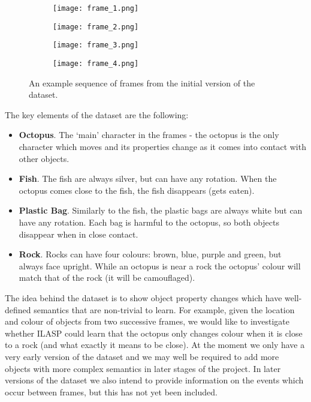 \documentclass[../interim.tex]{subfiles}
\begin{document}
\begin{figure}[ht!]
  \begin{subfigure}{0.24\textwidth}
    \centering
    \texttt{[image: frame\_1.png]}
  \end{subfigure}
  \hfill
  \begin{subfigure}{0.24\textwidth}
    \centering
    \texttt{[image: frame\_2.png]}
  \end{subfigure}
  \hfill
  \begin{subfigure}{0.24\textwidth}
    \centering
    \texttt{[image: frame\_3.png]}
  \end{subfigure}
  \hfill
  \begin{subfigure}{0.24\textwidth}
    \centering
    \texttt{[image: frame\_4.png]}
  \end{subfigure}
  \caption{An example sequence of frames from the initial version of the dataset.}
  \label{fig:dataset-frames}
\end{figure}

The key elements of the dataset are the following:
\begin{itemize}
  \item \textbf{Octopus}. The `main' character in the frames - the octopus is the only character which moves and its properties change as it comes into contact with other objects.

  \item \textbf{Fish}. The fish are always silver, but can have any rotation. When the octopus comes close to the fish, the fish disappears (gets eaten).

  \item \textbf{Plastic Bag}. Similarly to the fish, the plastic bags are always white but can have any rotation. Each bag is harmful to the octopus, so both objects disappear when in close contact.

  \item \textbf{Rock}. Rocks can have four colours: brown, blue, purple and green, but always face upright. While an octopus is near a rock the octopus' colour will match that of the rock (it will be camouflaged).
\end{itemize}

The idea behind the dataset is to show object property changes which have well-defined semantics that are non-trivial to learn. For example, given the location and colour of objects from two successive frames, we would like to investigate whether ILASP could learn that the octopus only changes colour when it is close to a rock (and what exactly it means to be close). At the moment we only have a very early version of the dataset and we may well be required to add more objects with more complex semantics in later stages of the project. In later versions of the dataset we also intend to provide information on the events which occur between frames, but this has not yet been included.
\end{document}
